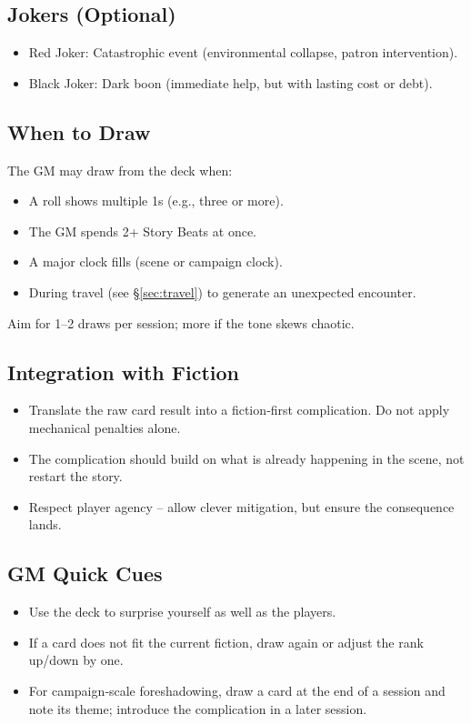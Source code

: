 \subsection{Jokers (Optional)}
\begin{itemize}
  \item Red Joker: Catastrophic event (environmental collapse, patron intervention).
  \item Black Joker: Dark boon (immediate help, but with lasting cost or debt).
\end{itemize}

\subsection{When to Draw}
The GM may draw from the deck when:
\begin{itemize}
  \item A roll shows multiple 1s (e.g., three or more).
  \item The GM spends 2+ Story Beats at once.
  \item A major clock fills (scene or campaign clock).
  \item During travel (see \S\ref{sec:travel}) to generate an unexpected encounter.
\end{itemize}
Aim for 1–2 draws per session; more if the tone skews chaotic.

\subsection{Integration with Fiction}
\begin{itemize}
  \item Translate the raw card result into a fiction‑first complication. Do not apply mechanical penalties alone.
  \item The complication should build on what is already happening in the scene, not restart the story.
  \item Respect player agency – allow clever mitigation, but ensure the consequence lands.
\end{itemize}

\subsection{GM Quick Cues}
\begin{itemize}
  \item Use the deck to surprise yourself as well as the players.
  \item If a card does not fit the current fiction, draw again or adjust the rank up/down by one.
  \item For campaign‑scale foreshadowing, draw a card at the end of a session and note its theme; introduce the complication in a later session.
\end{itemize}